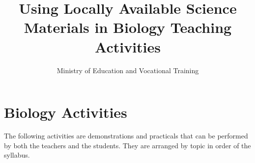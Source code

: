 \documentclass[12pt,a4paper]{book}
\author{Ministry of Education and Vocational Training}
\title{Using Locally Available Science Materials in Biology Teaching Activities }
\begin{document}




\tableofcontents







\chapter{Biology Activities}
The following activities are demonstrations and practicals that can be performed by both the teachers and the students. They are arranged by topic in order of the syllabus.









\end{document}
